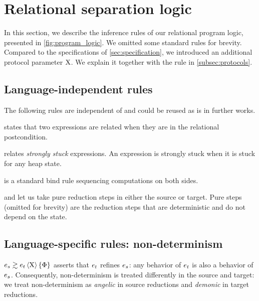 \section{Relational separation logic}
\label{sec:program_logic}



In this section, we describe the inference rules of our relational program logic,
presented in \cref{fig:program_logic}.
We omitted some standard rules for brevity.
Compared to the specifications of \cref{sec:specification}, we introduced an additional protocol parameter $\mathrm{X}$.
We explain it together with the  rule in \cref{subsec:protocols}.


\subsection{Language-independent rules}
The following rules are independent of \DataLang and could be reused as is in further works.

 states that two expressions are related when they are in the relational postcondition.

 relates \emph{strongly stuck} expressions.
An expression is strongly stuck when it is stuck for any heap state.

 is a standard bind rule sequencing computations on both sides.

 and  let us take pure reduction steps in either the source or target.
Pure steps (omitted for brevity) are the reduction steps that are deterministic and do not depend on the state.

\subsection{Language-specific rules: non-determinism}
$\iSimv[\iProt]{\iPred}{\datalangExpr_s}{\datalangExpr_t}$ asserts that $\datalangExpr_t$ refines $\datalangExpr_s$: any behavior of $\datalangExpr_t$ is also a behavior of $\datalangExpr_s$.
Consequently, non-determinism is treated differently in the source and target: we treat non-determinism as \emph{angelic} in source reductions and \emph{demonic} in target reductions.

